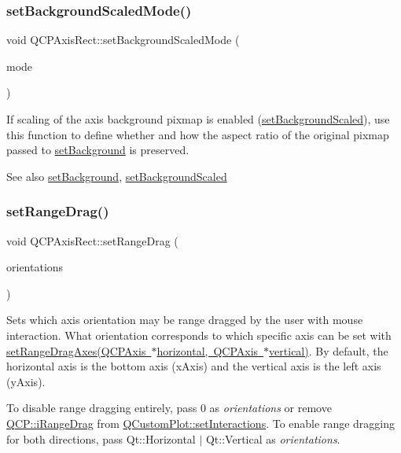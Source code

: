 \subsubsection{\texorpdfstring{set\+Background\+Scaled\+Mode()}{setBackgroundScaledMode()}}
{\footnotesize\ttfamily void Q\+C\+P\+Axis\+Rect\+::set\+Background\+Scaled\+Mode (\begin{DoxyParamCaption}\item[{Qt\+::\+Aspect\+Ratio\+Mode}]{mode }\end{DoxyParamCaption})}

If scaling of the axis background pixmap is enabled (\mbox{\hyperlink{class_q_c_p_axis_rect_ae6d36c3e0e968ffb991170a018e7b503}{set\+Background\+Scaled}}), use this function to define whether and how the aspect ratio of the original pixmap passed to \mbox{\hyperlink{class_q_c_p_axis_rect_af615ab5e52b8e0a9a0eff415b6559db5}{set\+Background}} is preserved. \begin{DoxySeeAlso}{See also}
\mbox{\hyperlink{class_q_c_p_axis_rect_af615ab5e52b8e0a9a0eff415b6559db5}{set\+Background}}, \mbox{\hyperlink{class_q_c_p_axis_rect_ae6d36c3e0e968ffb991170a018e7b503}{set\+Background\+Scaled}} 
\end{DoxySeeAlso}
\mbox{\label{class_q_c_p_axis_rect_ae6aef2f7211ba6097c925dcd26008418}} 
\subsubsection{\texorpdfstring{set\+Range\+Drag()}{setRangeDrag()}}
{\footnotesize\ttfamily void Q\+C\+P\+Axis\+Rect\+::set\+Range\+Drag (\begin{DoxyParamCaption}\item[{Qt\+::\+Orientations}]{orientations }\end{DoxyParamCaption})}

Sets which axis orientation may be range dragged by the user with mouse interaction. What orientation corresponds to which specific axis can be set with \mbox{\hyperlink{class_q_c_p_axis_rect_a648cce336bd99daac4a5ca3e5743775d}{set\+Range\+Drag\+Axes(\+Q\+C\+P\+Axis $\ast$horizontal, Q\+C\+P\+Axis $\ast$vertical)}}. By default, the horizontal axis is the bottom axis (x\+Axis) and the vertical axis is the left axis (y\+Axis).

To disable range dragging entirely, pass 0 as {\itshape orientations} or remove \mbox{\hyperlink{namespace_q_c_p_a2ad6bb6281c7c2d593d4277b44c2b037a2c4432b9aceafb94000be8d1b589ef18}{Q\+C\+P\+::i\+Range\+Drag}} from \mbox{\hyperlink{class_q_custom_plot_a5ee1e2f6ae27419deca53e75907c27e5}{Q\+Custom\+Plot\+::set\+Interactions}}. To enable range dragging for both directions, pass {\ttfamily Qt\+::\+Horizontal $\vert$ Qt\+::\+Vertical} as {\itshape orientations}.

